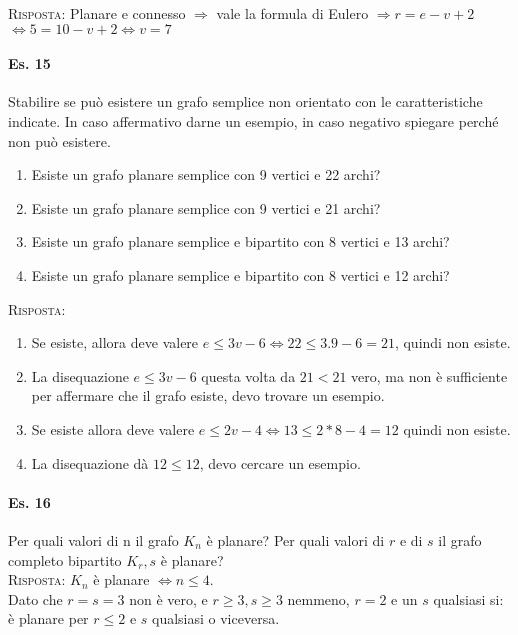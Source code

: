 \noindent
\textsc{Risposta:} Planare e connesso $\Rightarrow$ vale la formula di Eulero $\Rightarrow r=e-v+2$ \\
\(\Leftrightarrow 5=10-v+2 \Leftrightarrow v=7\)

\paragraph{Es. 15}Stabilire se può esistere un grafo semplice non orientato con le caratteristiche indicate. In caso affermativo darne un esempio, in caso negativo spiegare perché non può esistere.
\begin{enumerate}
    \item Esiste un grafo planare semplice con 9 vertici e 22 archi?
    \item Esiste un grafo planare semplice con 9 vertici e 21 archi?
    \item Esiste un grafo planare semplice e bipartito con 8 vertici e 13 archi?
    \item Esiste un grafo planare semplice e bipartito con 8 vertici e 12 archi?
\end{enumerate}
\textsc{Risposta:}
\begin{enumerate}
    \item Se esiste, allora deve valere \(e \leq 3v-6 \Leftrightarrow 22 \leq 3.9-6=21\), quindi non esiste.
    \item La disequazione \(e \leq 3v -6\) questa volta da $21<21$ vero, ma non è sufficiente per affermare che il grafo esiste, devo trovare un esempio.
    \item Se esiste allora deve valere \(e \leq 2v -4 \Leftrightarrow 13 \leq 2*8 -4= 12 \) quindi non esiste.
    \item La disequazione dà $12 \leq 12$, devo cercare un esempio.
\end{enumerate}

\paragraph{Es. 16} Per quali valori di n il grafo $K_n$ è planare? Per quali valori di $r$ e di $s$ il grafo completo bipartito $K_r,s$ è planare?\\

\noindent
\textsc{Risposta:} $K_n$ è planare $\Leftrightarrow n \leq 4$. \\
Dato che \(r=s=3 \) non è vero, e \(r \geq 3 , s \geq 3\) nemmeno, \(r=2\) e un $s$ qualsiasi si: è planare per $r\leq 2$ e $s$ qualsiasi o viceversa.

